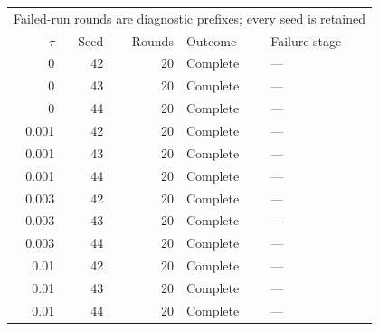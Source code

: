 \begin{tabular}{rrrll}
\toprule
\multicolumn{5}{l}{Failed-run rounds are diagnostic prefixes; every seed is retained} \\
$\tau$ & Seed & Rounds & Outcome & Failure stage \\
\midrule
0 & 42 & 20 & Complete & --- \\
0 & 43 & 20 & Complete & --- \\
0 & 44 & 20 & Complete & --- \\
0.001 & 42 & 20 & Complete & --- \\
0.001 & 43 & 20 & Complete & --- \\
0.001 & 44 & 20 & Complete & --- \\
0.003 & 42 & 20 & Complete & --- \\
0.003 & 43 & 20 & Complete & --- \\
0.003 & 44 & 20 & Complete & --- \\
0.01 & 42 & 20 & Complete & --- \\
0.01 & 43 & 20 & Complete & --- \\
0.01 & 44 & 20 & Complete & --- \\
\bottomrule
\end{tabular}
